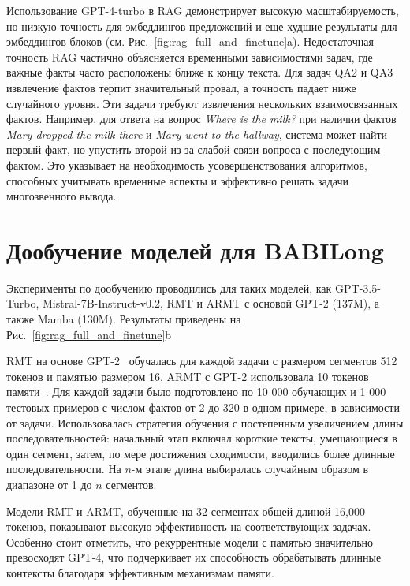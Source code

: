 Использование GPT-4-turbo в RAG демонстрирует высокую масштабируемость, но низкую точность для эмбеддингов предложений и еще худшие результаты для эмбеддингов блоков (см. Рис.~\ref{fig:rag_full_and_finetune}a). Недостаточная точность RAG частично объясняется временными зависимостями задач, где важные факты часто расположены ближе к концу текста. Для задач QA2 и QA3 извлечение фактов терпит значительный провал, а точность падает ниже случайного уровня. Эти задачи требуют извлечения нескольких взаимосвязанных фактов. Например, для ответа на вопрос \textit{Where is the milk?} при наличии фактов \textit{Mary dropped the milk there} и \textit{Mary went to the hallway}, система может найти первый факт, но упустить второй из-за слабой связи вопроса с последующим фактом. Это указывает на необходимость усовершенствования алгоритмов, способных учитывать временные аспекты и эффективно решать задачи многозвенного вывода.

\section{Дообучение моделей для BABILong}

Эксперименты по дообучению проводились для таких моделей, как GPT-3.5-Turbo, Mistral-7B-Instruct-v0.2, RMT и ARMT с основой GPT-2 (137M), а также Mamba (130M). Результаты приведены на Рис.~\ref{fig:rag_full_and_finetune}b %

RMT на основе GPT-2~\cite{radford2019gpt2} обучалась для каждой задачи с размером сегментов 512 токенов и памятью размером 16. ARMT с GPT-2 использовала 10 токенов памяти~\cite{rodkin2024associative}. Для каждой задачи было подготовлено по 10 000 обучающих и 1 000 тестовых примеров с числом фактов от 2 до 320 в одном примере, в зависимости от задачи. Использовалась стратегия обучения с постепенным увеличением длины последовательностей: начальный этап включал короткие тексты, умещающиеся в один сегмент, затем, по мере достижения сходимости, вводились более длинные последовательности. На \( n \)-м этапе длина выбиралась случайным образом в диапазоне от 1 до \( n \) сегментов.%



Модели RMT и ARMT, обученные на 32 сегментах общей длиной 16,000 токенов, показывают высокую эффективность на соответствующих задачах. Особенно стоит отметить, что рекуррентные модели с памятью значительно превосходят GPT-4, что подчеркивает их способность обрабатывать длинные контексты благодаря эффективным механизмам памяти.

